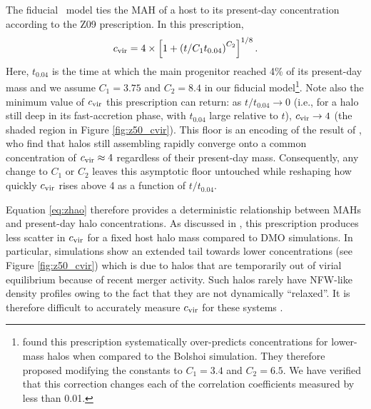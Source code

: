 \documentclass[twocolumn,apj,numberedappendix,twocolappendix,iop]{openjournal}
\begin{document}
The fiducial \SatGen\ model ties the MAH of a host to its present-day concentration according to the Z09 prescription. In this prescription, 
%
\begin{equation}
    c_{\rm vir}= 4 \times\left[1+\left(t / C_1 t_{0.04}\right)^{C_2}\right]^{1 / 8} .
    \label{eq:zhao}
\end{equation}
%
Here, $t_{0.04}$ is the time at which the main progenitor reached 4\% of its present-day mass and we assume $C_1 = 3.75$ and $C_2 = 8.4$ in our fiducial model\footnote{\cite{vdBosch.etal.14} found this prescription systematically over-predicts concentrations for lower-mass halos when compared to the Bolshoi simulation. They therefore proposed modifying the constants to $C_1 = 3.4$ and $C_2 = 6.5$. We have verified that this correction changes each of the correlation coefficients measured by less than 0.01.}. Note also the minimum value of $c_{\rm vir}$ this prescription can return: as $t/t_{0.04} \to 0$ (i.e., for a halo still deep in its fast-accretion phase, with $t_{0.04}$ large relative to $t$), $c_{\rm vir} \to 4$ (the shaded region in Figure \ref{fig:z50_cvir}). This floor is an encoding of the result of \cite{Zhao.04}, who find that halos still assembling rapidly converge onto a common concentration of $c_{\rm vir} \approx 4$ regardless of their present-day mass. Consequently, any change to $C_1$ or $C_2$ leaves this asymptotic floor untouched while reshaping how quickly $c_{\rm vir}$ rises above 4 as a function of $t/t_{0.04}$.

Equation \ref{eq:zhao} therefore provides a deterministic relationship between MAHs and present-day halo concentrations. As discussed in \cite{vdBosch.etal.14}, this prescription produces less scatter in $c_{\rm vir}$ for a fixed host halo mass compared to DMO simulations. In particular, simulations show an extended tail towards lower concentrations (see Figure \ref{fig:z50_cvir}) which is due to halos that are temporarily out of virial equilibrium because of recent merger activity. Such halos rarely have NFW-like density profiles owing to the fact that they are not dynamically ``relaxed''. It is therefore difficult to accurately measure $c_{\rm vir}$ for these systems \citep{Neto.etal.07, Ludlow.etal.13,Ludlow.etal.16,Klypin.etal.16}.
\end{document}
